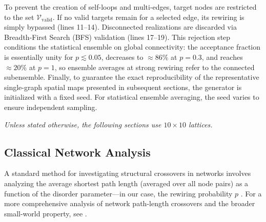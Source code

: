 \documentclass[pdflatex,sn-mathphys-num]{sn-jnl}
\begin{document}
To prevent the creation of self-loops and multi-edges, target nodes are restricted to the set $\mathcal{V}_{\text{valid}}$. If no valid targets remain for a selected edge, its rewiring is simply bypassed (lines 11--14). Disconnected realizations are discarded via Breadth-First Search (BFS) validation (lines 17--19). This rejection step conditions the statistical ensemble on global connectivity: the acceptance fraction is essentially unity for $p \lesssim 0.05$, decreases to ${\approx}86\%$ at $p=0.3$, and reaches ${\approx}20\%$ at $p=1$, so ensemble averages at strong rewiring refer to the connected subensemble. Finally, to guarantee the exact reproducibility of the representative single-graph spatial maps presented in subsequent sections, the generator is initialized with a fixed seed. For statistical ensemble averaging, the seed varies to ensure independent sampling.

\vspace{1em}
\textit{Unless stated otherwise, the following sections use $10 \times 10$ lattices.}

\subsection{Classical Network Analysis}

A standard method for investigating structural crossovers in networks involves analyzing the average shortest path length (averaged over all node pairs) as a function of the disorder parameter---in our case, the rewiring probability $p$ \cite{barthelemy}. For a more comprehensive analysis of network path-length crossovers and the broader small-world property, see \cite{newman, kleinberg}.
\end{document}
